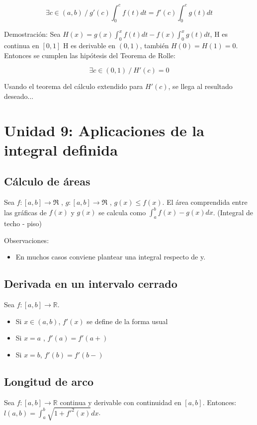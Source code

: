 \documentclass{report}
\begin{document}
		$$\exists c \in (a,b) \ / \ g'(c)\int_{0}^{c}f(t)dt=f'(c)\int_{0}^{c}g(t)dt$$
		
		Demostración: Sea $H(x)=g(x)\int_{0}^{x}f(t)dt-f(x)\int_{0}^{x}g(t)dt$, H es continua en $[0,1]$ H es derivable en $(0,1)$, también $H(0)=H(1)=0$. Entonces se cumplen las hipótesis del Teorema de Rolle:
		
		$$\exists c \in (0,1) \ / \ H'(c)=0$$
		
		Usando el teorema del cálculo extendido para $H'(c)$, se llega al resultado deseado...
	
\chapter{Unidad 9: Aplicaciones de la integral definida}
	\section{Cálculo de áreas}
		Sea $f:[a,b] \to \Re$ , $g:[a,b] \to \Re$ , $g(x) \leq f(x)$. El área comprendida entre las gráficas de $f(x)$ y $g(x)$ se calcula como $\int_{a}^{b}f(x)-g(x)dx$. (Integral de techo - piso)
		
		Observaciones:
			\begin{itemize}
				\item En muchos casos conviene plantear una integral respecto de y.
			\end{itemize}
		
	\section{Derivada en un intervalo cerrado}
		Sea $f:[a,b]\to \mathbb{R}$. 
		\begin{itemize}
			\item Si $x \in (a,b)$, $f'(x)$ se define de la forma usual
			\item Si $x=a$ , $f'(a)=f'(a+)$
			\item Si $x=b$, $f'(b)=f'(b-)$
		\end{itemize}
	
	\section{Longitud de arco}
		Sea $f:[a,b]\to\mathbb{R}$ continua y derivable con continuidad en $[a,b]$.
		Entonces: $l(a,b)=\int_{a}^{b}\sqrt{1+f'^2(x)}dx$.
		
		
\end{document}
